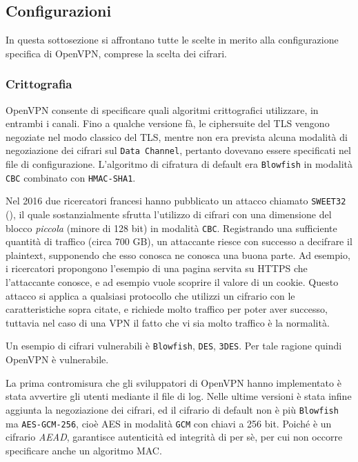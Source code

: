 \subsection{Configurazioni}
In questa sottosezione si affrontano tutte le scelte in merito alla configurazione
specifica
di OpenVPN, comprese la scelta dei cifrari.

\subsubsection{Crittografia}
OpenVPN consente di specificare quali algoritmi crittografici utilizzare, in entrambi i canali.
Fino a qualche versione fà, le ciphersuite del TLS vengono negoziate nel
modo classico del TLS, mentre non era prevista alcuna modalità di negoziazione
dei cifrari sul \texttt{Data Channel}, pertanto dovevano essere specificati
nel file di configurazione. L'algoritmo di cifratura di default era \texttt{Blowfish}
in modalità \texttt{CBC} combinato con \texttt{HMAC-SHA1}.

Nel 2016 due ricercatori francesi hanno pubblicato un attacco chiamato \texttt{SWEET32} (\cite{BL16:Sweet32}),
il quale sostanzialmente sfrutta l'utilizzo di cifrari con una dimensione del blocco
\textit{piccola} (minore di 128 bit) in modalità \texttt{CBC}. Registrando
una sufficiente quantità di traffico (circa 700 GB), un attaccante riesce con successo
a decifrare il plaintext, supponendo che esso conosca ne conosca una buona parte.
Ad esempio, i ricercatori propongono l'esempio di una pagina servita su HTTPS che l'attaccante
conosce, e ad esempio vuole scoprire il valore di un cookie. Questo attacco si applica
a qualsiasi protocollo che utilizzi un cifrario con le caratteristiche sopra citate, e richiede
molto traffico per poter aver successo, tuttavia nel caso di una VPN il fatto che
vi sia molto traffico è la normalità.

Un esempio di cifrari vulnerabili è \texttt{Blowfish}, \texttt{DES}, \texttt{3DES}.
Per tale ragione quindi OpenVPN è vulnerabile.


La prima contromisura che gli sviluppatori di OpenVPN hanno implementato è stata
avvertire gli utenti mediante il file di log. Nelle ultime versioni è stata infine
aggiunta la negoziazione dei cifrari, ed il cifrario di default non è più
\texttt{Blowfish} ma \texttt{AES-GCM-256}, cioè AES in modalità \texttt{GCM} con
chiavi a 256 bit. Poiché è un cifrario \textit{AEAD}, garantisce autenticità ed
integrità di per sè, per cui non occorre specificare anche un algoritmo MAC.


